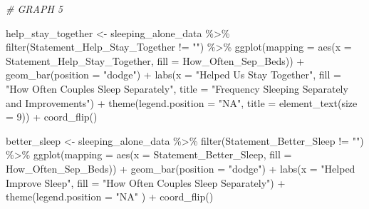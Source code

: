 \documentclass[
]{article}
\newenvironment{Shaded}{\begin{snugshade}}{\end{snugshade}}
\newcommand{\AttributeTok}[1]{\textcolor[rgb]{0.77,0.63,0.00}{#1}}
\newcommand{\CommentTok}[1]{\textcolor[rgb]{0.56,0.35,0.01}{\textit{#1}}}
\newcommand{\DecValTok}[1]{\textcolor[rgb]{0.00,0.00,0.81}{#1}}
\newcommand{\FunctionTok}[1]{\textcolor[rgb]{0.00,0.00,0.00}{#1}}
\newcommand{\NormalTok}[1]{#1}
\newcommand{\OtherTok}[1]{\textcolor[rgb]{0.56,0.35,0.01}{#1}}
\newcommand{\SpecialCharTok}[1]{\textcolor[rgb]{0.00,0.00,0.00}{#1}}
\newcommand{\StringTok}[1]{\textcolor[rgb]{0.31,0.60,0.02}{#1}}
\begin{document}
\begin{Shaded}
\begin{Highlighting}[]
\CommentTok{\# GRAPH 5}

\NormalTok{help\_stay\_together }\OtherTok{\textless{}{-}}\NormalTok{ sleeping\_alone\_data }\SpecialCharTok{\%\textgreater{}\%} \FunctionTok{filter}\NormalTok{(Statement\_Help\_Stay\_Together }\SpecialCharTok{!=} \StringTok{""}\NormalTok{) }\SpecialCharTok{\%\textgreater{}\%}
                      \FunctionTok{ggplot}\NormalTok{(}\AttributeTok{mapping =} \FunctionTok{aes}\NormalTok{(}\AttributeTok{x =}\NormalTok{ Statement\_Help\_Stay\_Together,}
                                           \AttributeTok{fill =}\NormalTok{ How\_Often\_Sep\_Beds)) }\SpecialCharTok{+}
                     \FunctionTok{geom\_bar}\NormalTok{(}\AttributeTok{position =} \StringTok{"dodge"}\NormalTok{) }\SpecialCharTok{+} 
                     \FunctionTok{labs}\NormalTok{(}\AttributeTok{x =} \StringTok{"Helped Us Stay Together"}\NormalTok{,}
                          \AttributeTok{fill =} \StringTok{"How Often Couples Sleep Separately"}\NormalTok{,}
                          \AttributeTok{title =} \StringTok{"Frequency Sleeping Separately and Improvements"}\NormalTok{) }\SpecialCharTok{+}
                     \FunctionTok{theme}\NormalTok{(}\AttributeTok{legend.position =} \StringTok{"NA"}\NormalTok{, }
                           \AttributeTok{title =} \FunctionTok{element\_text}\NormalTok{(}\AttributeTok{size =} \DecValTok{9}\NormalTok{)) }\SpecialCharTok{+}
                     \FunctionTok{coord\_flip}\NormalTok{()}

\NormalTok{better\_sleep }\OtherTok{\textless{}{-}}\NormalTok{ sleeping\_alone\_data }\SpecialCharTok{\%\textgreater{}\%} \FunctionTok{filter}\NormalTok{(Statement\_Better\_Sleep }\SpecialCharTok{!=} \StringTok{""}\NormalTok{) }\SpecialCharTok{\%\textgreater{}\%}
                      \FunctionTok{ggplot}\NormalTok{(}\AttributeTok{mapping =} \FunctionTok{aes}\NormalTok{(}\AttributeTok{x =}\NormalTok{ Statement\_Better\_Sleep,}
                                           \AttributeTok{fill =}\NormalTok{ How\_Often\_Sep\_Beds)) }\SpecialCharTok{+}
                     \FunctionTok{geom\_bar}\NormalTok{(}\AttributeTok{position =} \StringTok{"dodge"}\NormalTok{) }\SpecialCharTok{+} 
                     \FunctionTok{labs}\NormalTok{(}\AttributeTok{x =} \StringTok{"Helped Improve Sleep"}\NormalTok{,}
                          \AttributeTok{fill =} \StringTok{"How Often Couples Sleep Separately"}\NormalTok{) }\SpecialCharTok{+}
                     \FunctionTok{theme}\NormalTok{(}\AttributeTok{legend.position =} \StringTok{"NA"}\NormalTok{ ) }\SpecialCharTok{+}
                     \FunctionTok{coord\_flip}\NormalTok{()}


\end{Highlighting}
\end{Shaded}
\end{document}
